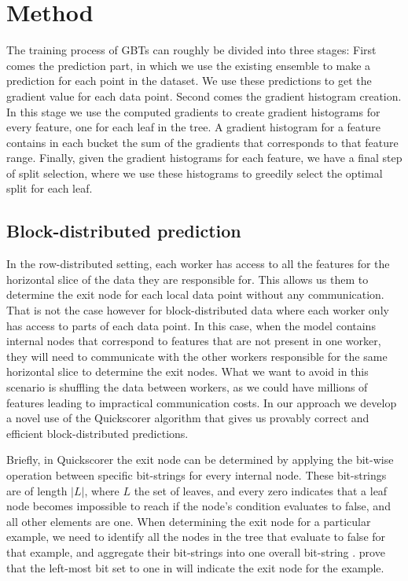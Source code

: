 \section{Method}
\label{sec:block-gbt-method}


The training process of GBTs can roughly be divided into three stages: First comes
the prediction part, in which we use the existing ensemble to make a prediction
for each point in the dataset. We use these predictions to get the gradient
value for each data point. Second comes the gradient histogram creation.
In this stage we use the computed gradients to create gradient histograms
for every feature, one for each leaf in the tree. A gradient histogram
for a feature contains in each bucket the sum of the gradients that corresponds to
that feature range. Finally, given the gradient histograms for each feature,
we have a final step of split selection, where we use these histograms to greedily
select the optimal split for each leaf.

\subsection{Block-distributed prediction}

In the row-distributed setting, each worker has access to all the features for the
horizontal slice of the data they are responsible for. This allows us them to determine
the exit node for each local data point without any communication.
That is not the case however
for block-distributed data where each worker only has access to parts of each data
point. In this case, when the model contains internal nodes that correspond to features
that are not present in one worker, they will need to communicate with the other
workers responsible for the same horizontal slice to determine the exit nodes.
What we want to avoid in this scenario is shuffling the data between workers,
as we could have millions of features leading to impractical communication
costs. In our approach we develop a novel use of the Quickscorer \cite{quickscorer} algorithm
that gives us provably correct and efficient block-distributed predictions.

Briefly, in Quickscorer the exit node can be determined by applying the bit-wise
\AND operation between specific bit-strings for every internal node.
These bit-strings are of length $|L|$, where $L$ the set of leaves, and
every zero indicates that a leaf node becomes impossible to reach if the node's
condition evaluates to false, and all other elements are one. When determining
the exit node for a particular example, we need to identify all the nodes in
the tree that evaluate to false for that example, and aggregate their bit-strings into one overall
bit-string \bitstring.
\citet{quickscorer}
prove that the left-most bit set to one in \bitstring will indicate the exit node for the example.

